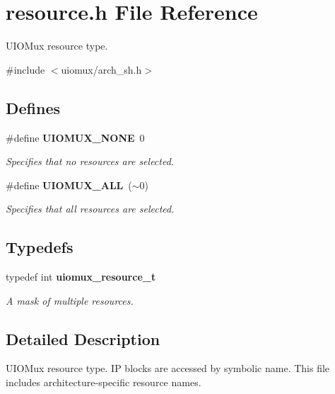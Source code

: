 \section{resource.h File Reference}
\label{resource_8h}


UIOMux resource type.  


{\ttfamily \#include $<$uiomux/arch\_\-sh.h$>$}\par
\subsection*{Defines}
\begin{DoxyCompactItemize}
\item 
\#define {\bf UIOMUX\_\-NONE}~0\label{resource_8h_a24230f93f1a6e395adab485e88628f8a}

\begin{DoxyCompactList}\small\item\em Specifies that no resources are selected. \item\end{DoxyCompactList}\item 
\#define {\bf UIOMUX\_\-ALL}~($\sim$0)\label{resource_8h_a6588d48e914b9f2830cc6290b745094a}

\begin{DoxyCompactList}\small\item\em Specifies that all resources are selected. \item\end{DoxyCompactList}\end{DoxyCompactItemize}
\subsection*{Typedefs}
\begin{DoxyCompactItemize}
\item 
typedef int {\bf uiomux\_\-resource\_\-t}
\begin{DoxyCompactList}\small\item\em A mask of multiple resources. \item\end{DoxyCompactList}\end{DoxyCompactItemize}


\subsection{Detailed Description}
UIOMux resource type. IP blocks are accessed by symbolic name. This file includes architecture-\/specific resource names. 

